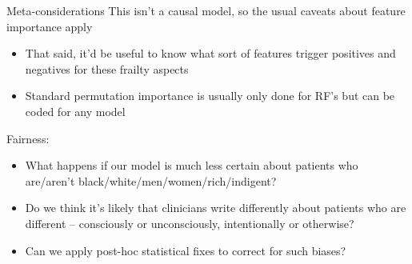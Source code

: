 \documentclass[10pt]{beamer}
\begin{document}
\begin{frame}{Meta-considerations}
This isn't a causal model, so the usual caveats about feature importance apply
\begin{itemize}
\item That said, it'd be useful to know what sort of features trigger positives and negatives for these frailty aspects
\item Standard permutation importance is usually only done for RF's but can be coded for any model
\end{itemize}
Fairness:
\begin{itemize}
\item What happens if our model is much less certain about patients who are/aren't black/white/men/women/rich/indigent?
\item Do we think it's likely that clinicians write differently about patients who are different -- consciously or unconsciously, intentionally or otherwise?
\item Can we apply post-hoc statistical fixes to correct for such biases?
\end{itemize}
\end{frame}
\end{document}
